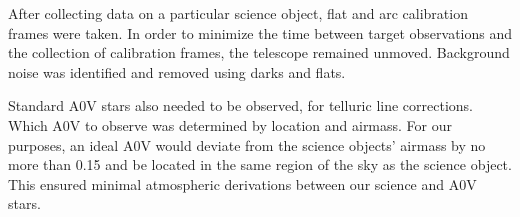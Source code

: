 After collecting data on a particular science object, 
flat and arc calibration frames were taken.  
In order to minimize the time between target observations and 
the collection of calibration frames, the telescope remained unmoved.  
Background noise was identified and removed using darks and flats.



Standard A0V stars also needed to be observed, for telluric line corrections.  Which A0V 
to observe was determined by location and airmass.  For our purposes, an ideal A0V would 
deviate from the science objects' airmass by no more than 0.15 and be located 
in the same region of the sky as the science object.  This ensured minimal 
atmospheric derivations between our science and A0V stars.


